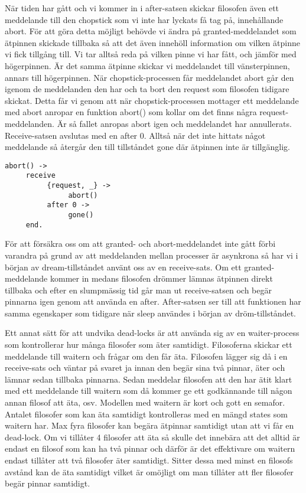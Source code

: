 \documentclass[a4paper, 11pt]{article}
\begin{document}
När tiden har gått och vi kommer in i after-satsen skickar filosofen även ett meddelande till den chopstick som vi inte har lyckats få tag på, innehållande abort.  För att göra detta möjligt behövde vi ändra på granted-meddelandet som ätpinnen skickade tillbaka så att det även innehöll information om vilken ätpinne vi fick tillgång till. Vi tar alltså reda på vilken pinne vi har fått, och jämför med högerpinnen. Är det samma ätpinne skickar vi meddelandet till vänsterpinnen, annars till högerpinnen. När chopstick-processen får meddelandet abort går den igenom de meddelanden den har och ta bort den request som filosofen tidigare skickat. Detta får vi genom att när chopstick-processen mottager ett meddelande med abort anropar en funktion abort() som kollar om det finns några request-meddelanden. Är så fallet anropas abort igen och meddelandet har annullerats. Receive-satsen avslutas med en after 0. Alltså när det inte hittats något meddelande så återgår den till tillståndet gone där ätpinnen inte är tillgänglig.
\begin{verbatim}
abort() ->
     receive
          {request, _} ->
               abort()
          after 0 ->
               gone()
     end.
\end{verbatim}

För att försäkra oss om att granted- och abort-meddelandet inte gått förbi varandra på grund av att meddelanden mellan processer är asynkrona så har vi i början av dream-tillståndet använt oss av en receive-sats. Om ett granted-meddelande kommer in medans filosofen drömmer lämnas ätpinnen direkt tillbaka och efter en slumpmässig tid går man ut receive-satsen och begär pinnarna igen genom att använda en after. After-satsen ser till att funktionen har samma egenskaper som tidigare när sleep användes i början av dröm-tillståndet.

Ett annat sätt för att undvika dead-locks är att använda sig av en waiter-process som kontrollerar hur många filosofer som äter samtidigt. Filosoferna skickar ett meddelande till waitern och frågar om den får äta. Filosofen lägger sig då i en receive-sats och väntar på svaret ja innan den begär sina två pinnar, äter och lämnar sedan tillbaka pinnarna. Sedan meddelar filosofen att den har ätit klart med ett meddelande till waitern som då kommer ge ett godkännande till någon annan filosof att äta, osv. Modellen med waitern är kort och gott en semafor. Antalet filosofer som kan äta samtidigt kontrolleras med en mängd states som waitern har. Max fyra filosofer kan begära ätpinnar samtidigt utan att vi får en dead-lock. Om vi tillåter 4 filosofer att äta så skulle det innebära att det alltid är endast en filosof som kan ha två pinnar och därför är det effektivare om waitern endast tillåter att två filosofer äter samtidigt. Sitter dessa med minst en filosofs avstånd kan de äta samtidigt vilket är omöjligt om man tillåter att fler filosofer begär pinnar samtidigt. 
\end{document}
